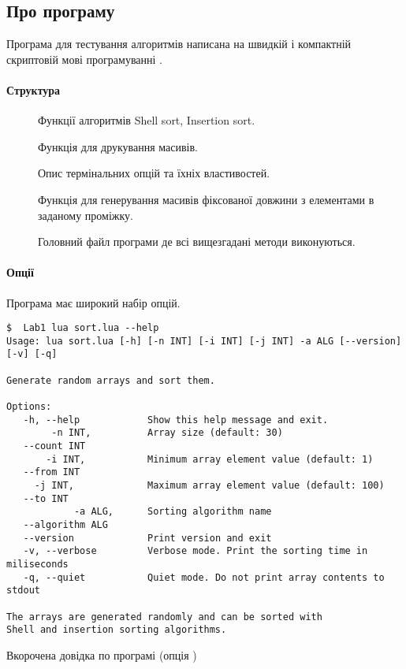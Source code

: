 \subsection{Про програму}
Програма для тестування алгоритмів написана на швидкій і компактній скриптовій мові
програмуванні .
\paragraph{Структура}
\begin{description}
	\item[] Функції алгоритмів Shell sort, Insertion sort.
	\item[] Функція для друкування масивів.
	\item[] Опис термінальних опцій та їхніх властивостей.
	\item[] Функція для генерування масивів фіксованої довжини з елементами в заданому проміжку.
	\item[] Головний файл програми де всі вищезгадані методи виконуються.
\end{description}
\paragraph{Опції}
Програма має широкий набір опцій.
\begin{listing}[H]
	\centering
	\begin{verbatim}
$  Lab1 lua sort.lua --help
Usage: lua sort.lua [-h] [-n INT] [-i INT] [-j INT] -a ALG [--version] [-v] [-q]

Generate random arrays and sort them.

Options:
   -h, --help            Show this help message and exit.
        -n INT,          Array size (default: 30)
   --count INT
       -i INT,           Minimum array element value (default: 1)
   --from INT
     -j INT,             Maximum array element value (default: 100)
   --to INT
            -a ALG,      Sorting algorithm name
   --algorithm ALG
   --version             Print version and exit
   -v, --verbose         Verbose mode. Print the sorting time in miliseconds
   -q, --quiet           Quiet mode. Do not print array contents to stdout

The arrays are generated randomly and can be sorted with
Shell and insertion sorting algorithms.
	\end{verbatim}
	\caption[Опція ]{Вкорочена довідка по програмі (опція )}
	\label{lst:help}
\end{listing}
